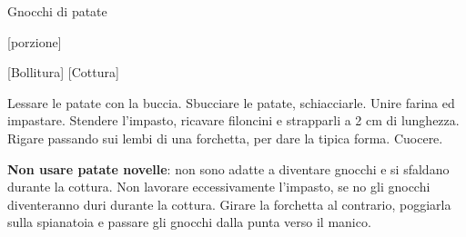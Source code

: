 \begin{recipe}[label=gnocchi]{Gnocchi di patate}
    \begin{header}
        [porzione]

        [Bollitura]
        [Cottura]
    \end{header}
    
    \begin{ingredients}[1]
    \end{ingredients}
    
    \begin{preparation}
        \step Lessare le patate con la buccia.
        \step Sbucciare le patate, schiacciarle.
        \step Unire farina ed impastare.
        \step Stendere l'impasto, ricavare filoncini e strapparli a 2 cm di lunghezza.
        \step Rigare passando sui lembi di una forchetta, per dare la tipica forma.
        \step Cuocere.
    \end{preparation}
    
    \begin{suggestion}
        \suggestionMark \textbf{Non usare patate novelle}: non sono adatte a diventare gnocchi e si sfaldano durante la cottura.
        \suggestionMark Non lavorare eccessivamente l'impasto, se no gli gnocchi diventeranno duri durante la cottura.
        \suggestionMark Girare la forchetta al contrario, poggiarla sulla spianatoia e passare gli gnocchi dalla punta verso il manico.
    \end{suggestion}
\end{recipe}
